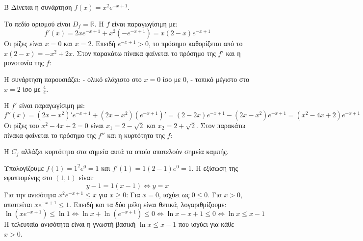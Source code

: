 
\begin{thema}{Β}
Δίνεται η συνάρτηση $f(x) = x^2e^{-x+1}$.

\begin{erwthma}
\item Το πεδίο ορισμού είναι $D_f = \mathbb{R}$. Η $f$ είναι παραγωγίσιμη με:
\[ f'(x) = 2x e^{-x+1} + x^2(-e^{-x+1}) = x(2- x)e^{-x+1} \]
Οι ρίζες είναι $x=0$ και $x=2$. Επειδή $e^{-x+1} > 0$, το πρόσημο καθορίζεται από το $x(2-x) = -x^2+2x$.
Στον παρακάτω πίνακα φαίνεται το πρόσημο της $f'$ και η μονοτονία της $f$:
\begin{center}
\end{center}
Η συνάρτηση παρουσιάζει:
- ολικό ελάχιστο στο $x=0$ ίσο με $0$, 
- τοπικό μέγιστο στο $x=2$ ίσο με $\frac{4}{e}$.

\item Η $f'$ είναι παραγωγίσιμη με:
\[ f''(x) = (2x-x^2)'e^{-x+1} + (2x-x^2)(e^{-x+1})' = (2-2x)e^{-x+1} - (2x-x^2)e^{-x+1} = (x^2-4x+2)e^{-x+1} \]
Οι ρίζες του $x^2-4x+2=0$ είναι $x_1 = 2-\sqrt{2}$ και $x_2 = 2+\sqrt{2}$.
Στον παρακάτω πίνακα φαίνεται το πρόσημο της $f''$ και η κυρτότητα της $f$:
\begin{center}
\end{center}
Η $C_f$ αλλάζει κυρτότητα στα σημεία αυτά τα οποία αποτελούν σημεία καμπής.

\item Υπολογίζουμε $f(1) = 1^2e^0 = 1$ και $f'(1) = 1(2-1)e^0 = 1$.
Η εξίσωση της εφαπτομένης στο $(1, 1)$ είναι:
\[ y - 1 = 1(x - 1) \Leftrightarrow y = x \]
Για την ανισότητα $x^2e^{-x+1} \le x$ για $x \ge 0$:
Για $x=0$, ισχύει ως $0 \le 0$.
Για $x > 0$, απαιτείται $x e^{-x+1} \le 1$. Επειδή και τα δύο μέλη είναι θετικά, λογαριθμίζουμε:
\[ \ln(xe^{-x+1}) \le \ln 1 \Leftrightarrow \ln x + \ln(e^{-x+1}) \le 0 \Leftrightarrow \ln x - x + 1 \le 0 \Leftrightarrow \ln x \le x - 1 \]
Η τελευταία ανισότητα είναι η γνωστή βασική $\ln x \le x-1$ που ισχύει για κάθε $x>0$.


\end{erwthma}
\end{thema}
